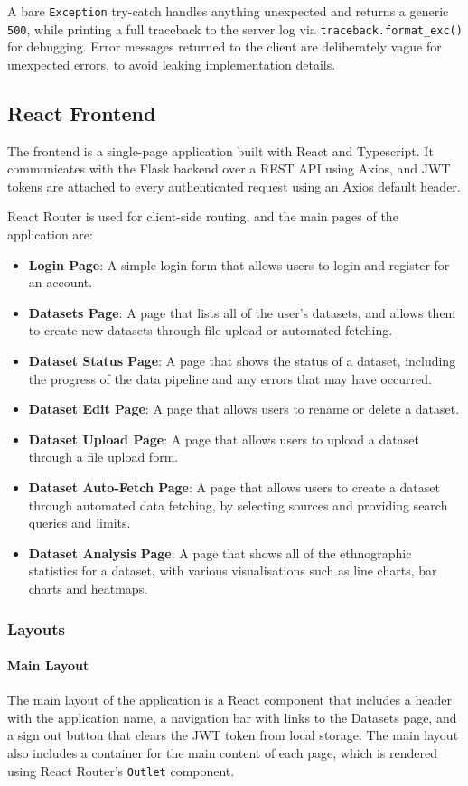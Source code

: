 \documentclass[12pt, a4paper]{article}
\begin{document}
A bare \texttt{Exception} try-catch handles anything unexpected and returns a generic \texttt{500}, while printing a full traceback to the server log via \texttt{traceback.format\_exc()} for debugging. Error messages returned to the client are deliberately vague for unexpected errors, to avoid leaking implementation details.

\subsection{React Frontend}
The frontend is a single-page application built with React and Typescript. It communicates with the Flask backend over a REST API using Axios, and JWT tokens are attached to every authenticated request using an Axios default header. 

React Router is used for client-side routing, and the main pages of the application are:
\begin{itemize}
    \item \textbf{Login Page}: A simple login form that allows users to login and register for an account.
    \item \textbf{Datasets Page}: A page that lists all of the user's datasets, and allows them to create new datasets through file upload or automated fetching.
    \item \textbf{Dataset Status Page}: A page that shows the status of a dataset, including the progress of the data pipeline and any errors that may have occurred.
    \item \textbf{Dataset Edit Page}: A page that allows users to rename or delete a dataset.
    \item \textbf{Dataset Upload Page}: A page that allows users to upload a dataset through a file upload form.
    \item \textbf{Dataset Auto-Fetch Page}: A page that allows users to create a dataset through automated data fetching, by selecting sources and providing search queries and limits.
    \item \textbf{Dataset Analysis Page}: A page that shows all of the ethnographic statistics for a dataset, with various visualisations such as line charts, bar charts and heatmaps.
\end{itemize}

\subsubsection{Layouts}
\paragraph{Main Layout}
The main layout of the application is a React component that includes a header with the application name, a navigation bar with links to the Datasets page, and a sign out button that clears the JWT token from local storage. The main layout also includes a container for the main content of each page, which is rendered using React Router's \texttt{Outlet} component.
\end{document}
